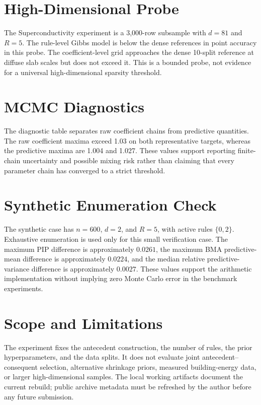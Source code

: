 \documentclass[1p,times]{elsarticle}
\begin{document}
\FloatBarrier

\section{High-Dimensional Probe}





The Superconductivity experiment is a 3,000-row subsample with $d=81$ and
$R=5$.  The rule-level Gibbs model is below the dense references in point
accuracy in this probe.  The coefficient-level grid approaches the dense
10-split reference at diffuse slab scales but does not exceed it.
This is a bounded probe, not evidence for a universal high-dimensional
sparsity threshold.

\FloatBarrier

\section{MCMC Diagnostics}



The diagnostic table separates raw coefficient chains from predictive
quantities.  The raw coefficient maxima exceed 1.03 on both representative
targets, whereas the predictive maxima are 1.004 and 1.027.  These values
support reporting finite-chain uncertainty and possible mixing risk rather
than claiming that every parameter chain has converged to a strict
threshold.

\FloatBarrier

\section{Synthetic Enumeration Check}



The synthetic case has $n=600$, $d=2$, and $R=5$, with active rules
$\{0,2\}$.  Exhaustive enumeration is used only for this small verification
case.  The maximum PIP difference is approximately $0.0261$, the maximum
BMA predictive-mean difference is approximately $0.0224$, and the median
relative predictive-variance difference is approximately $0.0027$.
These values support the arithmetic implementation without implying zero
Monte Carlo error in the benchmark experiments.

\FloatBarrier

\section{Scope and Limitations}

The experiment fixes the antecedent construction, the number of rules, the
prior hyperparameters, and the data splits.  It does not evaluate joint
antecedent--consequent selection, alternative shrinkage priors, measured
building-energy data, or larger high-dimensional samples.  The local
working artifacts document the current rebuild; public archive metadata
must be refreshed by the author before any future submission.
\end{document}
